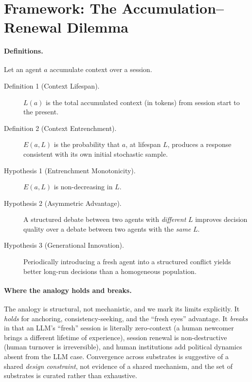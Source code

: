 \documentclass[12pt]{article}
\begin{document}
\section{Framework: The Accumulation--Renewal Dilemma}
\label{sec:framework}

\paragraph{Definitions.} Let an agent $a$ accumulate context over a session.

\begin{description}
\item[Definition 1 (Context Lifespan).] $L(a)$ is the total accumulated context
(in tokens) from session start to the present.
\item[Definition 2 (Context Entrenchment).] $E(a,L)$ is the probability that
$a$, at lifespan $L$, produces a response consistent with its own initial
stochastic sample.
\end{description}

\begin{description}
\item[Hypothesis 1 (Entrenchment Monotonicity).] $E(a,L)$ is non-decreasing
in $L$.
\item[Hypothesis 2 (Asymmetric Advantage).] A structured debate between two
agents with \emph{different} $L$ improves decision quality over a debate between
two agents with the \emph{same} $L$.
\item[Hypothesis 3 (Generational Innovation).] Periodically introducing a fresh
agent into a structured conflict yields better long-run decisions than a
homogeneous population.
\end{description}

\paragraph{Where the analogy holds and breaks.} The analogy is structural, not
mechanistic, and we mark its limits explicitly. It \emph{holds} for
anchoring, consistency-seeking, and the ``fresh eyes'' advantage. It
\emph{breaks} in that an LLM's ``fresh'' session is literally zero-context
(a human newcomer brings a different lifetime of experience), session renewal
is non-destructive (human turnover is irreversible), and human institutions add
political dynamics absent from the LLM case. Convergence across substrates is
suggestive of a shared \emph{design constraint}, not evidence of a shared
mechanism, and the set of substrates is curated rather than exhaustive.
\end{document}
